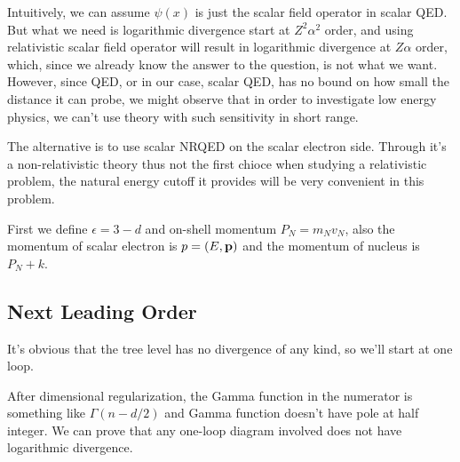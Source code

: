 \documentclass[aps,prd,preprint,showkeys,10pt]{revtex4-1}
\newcommand{\vbp}{\vb{p}}
\renewcommand{\a}{\alpha}
\begin{document}
Intuitively, we can assume $\psi(x)$ is just the scalar field operator in scalar QED. But what we need is logarithmic divergence start at $Z^2\a^2$ order, and using relativistic scalar field operator will result in logarithmic divergence at $Z\a$ order, which, since we already know the answer to the question, is not what we want. However, since QED, or in our case, scalar QED, has no bound on how small the distance it can probe, we might observe that in order to investigate low energy physics, we can't use theory with such sensitivity in short range.

The alternative is to use scalar NRQED on the scalar electron side. Through it's a non-relativistic theory thus not the first chioce when studying a relativistic problem, the natural energy cutoff it provides will be very convenient in this problem.

First we define $\epsilon=3-d$ and on-shell momentum $P_N=m_Nv_N$, also the momentum of scalar electron is $p=(E,\vbp)$ and the momentum of nucleus is $P_N+k$.
\subsection{Next Leading Order}
It's obvious that the tree level has no divergence of any kind, so we'll start at one loop.

After dimensional regularization, the Gamma function in the numerator is something like $\Gamma(n-d/2)$ and Gamma function doesn't have pole at half integer. We can prove that any one-loop diagram involved does not have logarithmic divergence.

\end{document}

